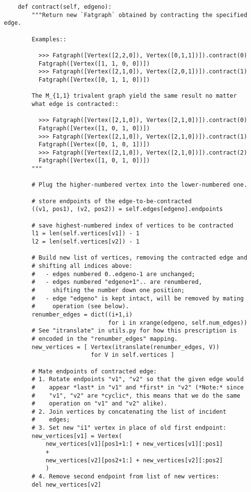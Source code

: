 \begin{lstlisting}
    def contract(self, edgeno):
        """Return new `Fatgraph` obtained by contracting the specified edge.

        Examples::

          >>> Fatgraph([Vertex([2,2,0]), Vertex([0,1,1])]).contract(0)
          Fatgraph([Vertex([1, 1, 0, 0])])
          >>> Fatgraph([Vertex([2,1,0]), Vertex([2,0,1])]).contract(1)
          Fatgraph([Vertex([0, 1, 1, 0])])

        The M_{1,1} trivalent graph yield the same result no matter
        what edge is contracted::

          >>> Fatgraph([Vertex([2,1,0]), Vertex([2,1,0])]).contract(0)
          Fatgraph([Vertex([1, 0, 1, 0])])
          >>> Fatgraph([Vertex([2,1,0]), Vertex([2,1,0])]).contract(1)
          Fatgraph([Vertex([0, 1, 0, 1])])
          >>> Fatgraph([Vertex([2,1,0]), Vertex([2,1,0])]).contract(2)
          Fatgraph([Vertex([1, 0, 1, 0])])
        """

        # Plug the higher-numbered vertex into the lower-numbered one.
        
        # store endpoints of the edge-to-be-contracted
        ((v1, pos1), (v2, pos2)) = self.edges[edgeno].endpoints

        # save highest-numbered index of vertices to be contracted
        l1 = len(self.vertices[v1]) - 1
        l2 = len(self.vertices[v2]) - 1

        # Build new list of vertices, removing the contracted edge and
        # shifting all indices above:
        #   - edges numbered 0..edgeno-1 are unchanged;
        #   - edges numbered "edgeno+1".. are renumbered, 
        #     shifting the number down one position;
        #   - edge "edgeno" is kept intact, will be removed by mating
        #     operation (see below).
        renumber_edges = dict((i+1,i)
                              for i in xrange(edgeno, self.num_edges))
        # See "itranslate" in utils.py for how this prescription is
        # encoded in the "renumber_edges" mapping.
        new_vertices = [ Vertex(itranslate(renumber_edges, V))
                         for V in self.vertices ]

        # Mate endpoints of contracted edge:
        # 1. Rotate endpoints "v1", "v2" so that the given edge would
        #    appear *last* in "v1" and *first* in "v2" (*Note:* since
        #    "v1", "v2" are *cyclic*, this means that we do the same
        #    operation on "v1" and "v2" alike).
        # 2. Join vertices by concatenating the list of incident
        #    edges;
        # 3. Set new "i1" vertex in place of old first endpoint:
        new_vertices[v1] = Vertex(
            new_vertices[v1][pos1+1:] + new_vertices[v1][:pos1]
            +
            new_vertices[v2][pos2+1:] + new_vertices[v2][:pos2]
            )
        # 4. Remove second endpoint from list of new vertices:
        del new_vertices[v2]


\end{lstlisting}
